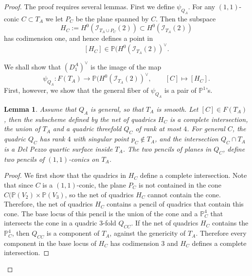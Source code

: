 \documentclass[a4paper,11pt]{amsart}
\newtheorem{lemma}[thm]{Lemma}
\theoremstyle{definition}
\numberwithin{equation}{section}
\numberwithin{equation}{section} \theoremstyle{definition}
\begin{document}
\begin{proof}
The proof requires several lemmas.  First we define $\psi_{Q_A}$. 
For any $(1,1)$-conic $C\subset T_A$  we let $P_C$ be the plane spanned by $C$.
Then the subspace
$$H_C:= H^0({\mathcal I}_{T_A\cup P_C}(2))\subset H^0({\mathcal I}_{T_A}(2))
$$
has codimension one, and hence defines a point in  
\[
[H_C]\in
{{\mathbb{P}}}(H^0({\mathcal I}_{T_A}(2))^{\vee}.
\]

We shall show that $(D_1^A)^\vee$ is the image of the map 
\[
\psi_{Q_A}: F(T_A)\to {{\mathbb{P}}}(H^0({\mathcal I}_{T_A}(2))^{\vee},\qquad [C]\mapsto [H_C].
\]
First, however, we show that the general fiber of $\psi_{Q_A}$ is a pair of ${{\mathbb{P}}}^1$'s.
\begin{lemma}\label{phi_C} Assume that $Q_A$ is general, so that $T_A$ is smooth. Let $[C]\in F(T_A)$, then the subscheme defined by the net of quadrics $H_{C}$ is a complete intersection, the union of $T_A$ and a quadric threefold $Q_{C}$ of rank at most $4$. 
For general $C$, the quadric  $Q_{C}$ has rank $4$ with singular point $p_C\notin T_A$, and the intersection $Q_{C}\cap T_A$ is a Del Pezzo quartic surface inside $T_A$.  The two pencils of planes in $Q_{C}$, define two pencils of $(1,1)$-conics  on $T_A$.
\end{lemma}
\begin{proof}
We first show that the quadrics in $H_{C}$ define a complete intersection.
Note that since $C$ is a $(1,1)$-conic, the plane $P_C$ is not contained in the cone $C({{\mathbb{P}}}(V_2)\times {{\mathbb{P}}}(V_3)$, so the net of quadrics $H_{C}$ cannot contain the cone.    Therefore, the net of quadrics $H_{C}$ contains a pencil of quadrics that contain this cone.  The base locus of this pencil is the union of the cone and a ${{\mathbb{P}}}^4_C$ that intersects the cone in a quadric $3$-fold $Q_{CC}$. If the net of quadrics $H_C$  contains the ${{\mathbb{P}}}^4_C$, then $Q_{CC}$ is a component of $T_A$, against the genericity of $T_A$. Therefore every component in the base locus of $H_C$ has codimension $3$ and $H_{C}$ defines a complete intersection.


\end{proof}
\end{proof}
\end{document}
